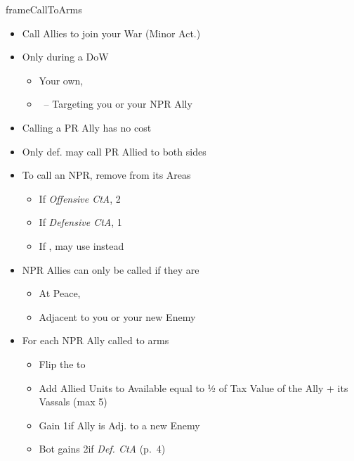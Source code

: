\documentclass[10pt]{article}
\newlength{\fhCallToArms} \setlength\fhCallToArms{23\baselineskip}
\begin{document}
\begin{dynamiccontents*}{frameCallToArms}\begin{eubox}{\fhCallToArms}
	\begin{itemize}
		\item Call Allies to join your War (Minor Act.)
		\item Only during a DoW
		\begin{itemize}
			\item Your own, 
			\item \reaction~-- Targeting you or your NPR Ally
		\end{itemize}
		\item Calling a PR Ally has no cost
		\item Only def. may call PR Allied to both sides
		\item To call an NPR, remove \influence from its Areas
		\begin{itemize}
			\item If \emph{Offensive CtA}, 2\influence
			\item If \emph{Defensive CtA}, 1\influence
			\item If , may use \colonists instead
		\end{itemize}
		\item NPR Allies can only be called if they are
		\begin{itemize}
			\item At Peace, 
			\item Adjacent to you or your new Enemy
		\end{itemize}
		\item For each NPR Ally called to arms
		\begin{itemize}
			\item Flip the \alliance to \activeally
			\item Add Allied Units to Available \manpower equal to ½ of Tax Value of the Ally + its Vassals (max 5)
			\item Gain 1\milpower if Ally is Adj. to a new Enemy
		\end{itemize}
		{\botrules
		\begin{itemize}
			\item Bot gains 2\botpower if \emph{Def. CtA} (p.~4)
		\end{itemize}
		}
\end{itemize}
\end{eubox}\end{dynamiccontents*}
\end{document}
